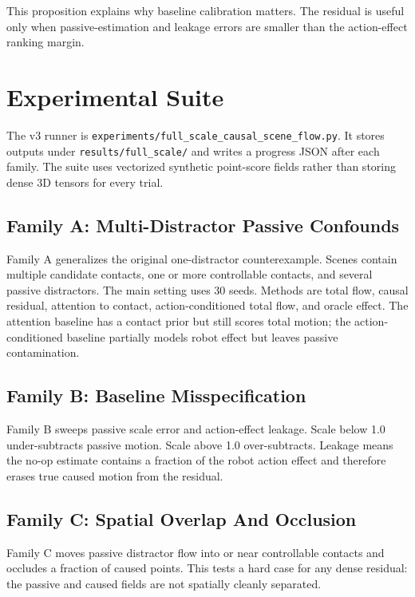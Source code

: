 \documentclass{article}
\begin{document}
This proposition explains why baseline calibration matters.  The residual is useful only
when passive-estimation and leakage errors are smaller than the action-effect ranking
margin.

\section{Experimental Suite}

The v3 runner is \texttt{experiments/full\_scale\_causal\_scene\_flow.py}.  It stores
outputs under \texttt{results/full\_scale/} and writes a progress JSON after each family.
The suite uses vectorized synthetic point-score fields rather than storing dense 3D
tensors for every trial.

\subsection{Family A: Multi-Distractor Passive Confounds}

Family A generalizes the original one-distractor counterexample.  Scenes contain multiple
candidate contacts, one or more controllable contacts, and several passive distractors.
The main setting uses 30 seeds.  Methods are total flow, causal residual, attention to
contact, action-conditioned total flow, and oracle effect.  The attention baseline has a
contact prior but still scores total motion; the action-conditioned baseline partially
models robot effect but leaves passive contamination.

\subsection{Family B: Baseline Misspecification}

Family B sweeps passive scale error and action-effect leakage.  Scale below 1.0
under-subtracts passive motion.  Scale above 1.0 over-subtracts.  Leakage means the no-op
estimate contains a fraction of the robot action effect and therefore erases true caused
motion from the residual.

\subsection{Family C: Spatial Overlap And Occlusion}

Family C moves passive distractor flow into or near controllable contacts and occludes a
fraction of caused points.  This tests a hard case for any dense residual: the passive
and caused fields are not spatially cleanly separated.
\end{document}

